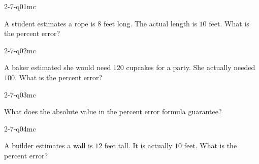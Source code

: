 

\begin{practiceQuestion}{2-7-q01}{mc}
\begin{questionText}
A student estimates a rope is $8$ feet long. The actual length is $10$ feet. What is the percent error?
\end{questionText}
\end{practiceQuestion}

\begin{practiceQuestion}{2-7-q02}{mc}
\begin{questionText}
A baker estimated she would need $120$ cupcakes for a party. She actually needed $100$. What is the percent error?
\end{questionText}
\end{practiceQuestion}

\begin{practiceQuestion}{2-7-q03}{mc}
\begin{questionText}
What does the absolute value in the percent error formula guarantee?
\end{questionText}
\end{practiceQuestion}

\begin{practiceQuestion}{2-7-q04}{mc}
\begin{questionText}
A builder estimates a wall is $12$ feet tall. It is actually $10$ feet. What is the percent error?
\end{questionText}
\end{practiceQuestion}

